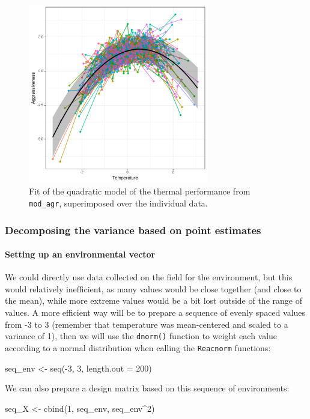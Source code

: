 \documentclass[a4paper,12pt,twoside]{article}
\begin{document}
\begin{figure}[b!h!]
  \includegraphics[width = 0.7\textwidth]{Aggressiveness_continuous_pred.pdf}
  \caption{Fit of the quadratic model of the thermal performance from \texttt{mod\_agr}, superimposed over the individual data.}
  \label{fig_pred_agr}
\end{figure}

\subsubsection{Decomposing the variance based on point estimates}

\paragraph{Setting up an environmental vector}
We could directly use data collected on the field for the environment, but this would relatively inefficient, as many values would be close together (and close to the mean), while more extreme values would be a bit lost outside of the range of values.
A more efficient way will be to prepare a sequence of evenly spaced values from -3 to 3 (remember that temperature was mean-centered and scaled to a variance of 1), then we will use the \texttt{dnorm()} function to weight each value according to a normal distribution when calling the \texttt{Reacnorm} functions:
\begin{Rinput}
seq_env <- seq(-3, 3, length.out = 200)
\end{Rinput}
We can also prepare a design matrix based on this sequence of environments:
\begin{Rinput}
seq_X   <- cbind(1, seq_env, seq_env^2)
\end{Rinput}
\end{document}
